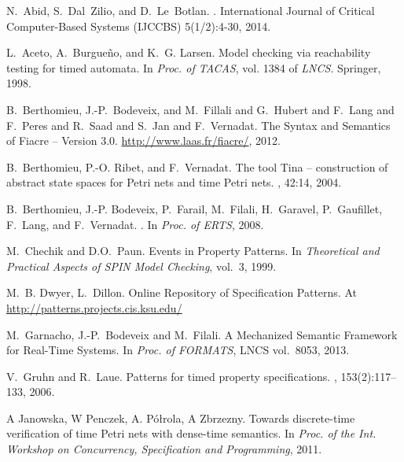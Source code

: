 \documentclass[a4paper]{scrartcl}
\begin{document}
{\footnotesize
\begin{thebibliography}{10}



 N.~Abid, S.~Dal~Zilio, and D.~Le~Botlan.  .  \newblock International Journal of Critical
  Computer-Based Systems (IJCCBS) 5(1/2):4-30, 2014.



L.~Aceto, A.~Burgue{\~n}o, and K.~G. Larsen.
\newblock Model checking via reachability testing for timed automata.
\newblock In {\em Proc. of TACAS}, vol. 1384 of {\em LNCS}. Springer, 1998.



B.~Berthomieu, J.-P.~Bodeveix, and M.~Fillali and G.~Hubert and F.~Lang and F.~Peres and R.~Saad and S.~Jan and F.~Vernadat.
\newblock The {S}yntax and {S}emantics of {F}iacre -- {V}ersion 3.0.
\newblock \url{http://www.laas.fr/fiacre/}, 2012.

B.~Berthomieu, P.-O. Ribet, and F.~Vernadat.
\newblock The tool Tina -- construction of abstract state spaces for {Petri}
  nets and time {Petri} nets.
, 42:14, 2004.

B.~Berthomieu, J.-P. Bodeveix, P.~Farail, M.~Filali, H.~Garavel, P.~Gaufillet,
  F.~Lang, and F.~Vernadat.
.
\newblock In {\em Proc. of {ERTS}}, 2008.

M.~Chechik and D.O.~Paun.
\newblock Events in Property Patterns.
\newblock In {\em Theoretical and Practical Aspects of SPIN Model Checking}, vol.~3, 1999.

 M.~B. Dwyer, L.~Dillon.
\newblock Online Repository of Specification Patterns. 
\newblock At \url{http://patterns.projects.cis.ksu.edu/}

 M.~Garnacho, J.-P.~Bodeveix and
  M.~Filali. \newblock A Mechanized Semantic Framework for Real-Time
  Systems. \newblock In {\em Proc. of FORMATS}, LNCS vol.~8053, 2013.

V.~Gruhn and R.~Laue.
\newblock Patterns for timed property specifications.
, 153(2):117--133, 2006.


 A Janowska, W Penczek,
  A. P{\'o}{\l}rola, A Zbrzezny. \newblock Towards discrete-time
  verification of time Petri nets with dense-time semantics. \newblock
  In {\em Proc. of the Int. Workshop on Concurrency, Specification and
    Programming}, 2011.


\end{thebibliography}}
\end{document}
